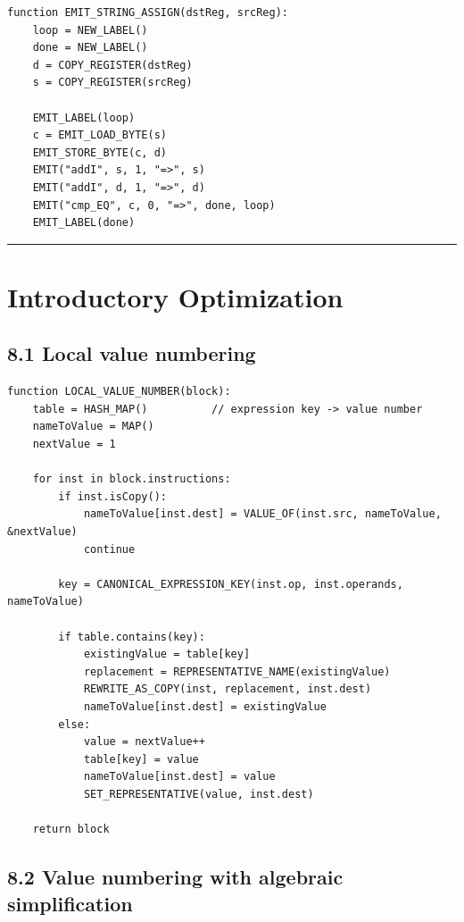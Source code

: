 \documentclass[10pt,letterpaper]{article}
\begin{document}
\begin{verbatim}
function EMIT_STRING_ASSIGN(dstReg, srcReg):
    loop = NEW_LABEL()
    done = NEW_LABEL()
    d = COPY_REGISTER(dstReg)
    s = COPY_REGISTER(srcReg)

    EMIT_LABEL(loop)
    c = EMIT_LOAD_BYTE(s)
    EMIT_STORE_BYTE(c, d)
    EMIT("addI", s, 1, "=>", s)
    EMIT("addI", d, 1, "=>", d)
    EMIT("cmp_EQ", c, 0, "=>", done, loop)
    EMIT_LABEL(done)
\end{verbatim}

\medskip\hrule\medskip

\clearpage
\section{Introductory Optimization}

\subsection*{8.1 Local value numbering}
{}

\begin{verbatim}
function LOCAL_VALUE_NUMBER(block):
    table = HASH_MAP()          // expression key -> value number
    nameToValue = MAP()
    nextValue = 1

    for inst in block.instructions:
        if inst.isCopy():
            nameToValue[inst.dest] = VALUE_OF(inst.src, nameToValue, &nextValue)
            continue

        key = CANONICAL_EXPRESSION_KEY(inst.op, inst.operands, nameToValue)

        if table.contains(key):
            existingValue = table[key]
            replacement = REPRESENTATIVE_NAME(existingValue)
            REWRITE_AS_COPY(inst, replacement, inst.dest)
            nameToValue[inst.dest] = existingValue
        else:
            value = nextValue++
            table[key] = value
            nameToValue[inst.dest] = value
            SET_REPRESENTATIVE(value, inst.dest)

    return block
\end{verbatim}

\subsection*{8.2 Value numbering with algebraic simplification}
{}
\end{document}
